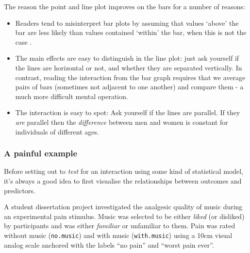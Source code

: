 \documentclass[]{article}
\begin{document}
The reason the point and line plot improves on the bars for a number of reasons:

\begin{itemize}
\item
  Readers tend to misinterpret bar plots by assuming that values `above' the
  bar are less likely than values contained `within' the bar, when this is not
  the case \citep{newman2012bar}.
\item
  The main effects are easy to distinguish in the line plot: just ask yourself
  if the lines are horizontal or not, and whether they are separated
  vertically. In contrast, reading the interaction from the bar graph requires
  that we average pairs of bars (sometimes not adjacent to one another) and
  compare them - a much more difficult mental operation.
\item
  The interaction is easy to spot: Ask yourself if the lines are parallel. If
  they \emph{are} parallel then the \emph{difference} between men and women is constant
  for individuals of different ages.
\end{itemize}

\hypertarget{pain-music-data}{%
\subsubsection*{A painful example}\label{pain-music-data}}

Before setting out to \emph{test} for an interaction using some kind of statistical
model, it's always a good idea to first visualise the relationships between
outcomes and predictors.

A student dissertation project investigated the analgesic quality of music
during an experimental pain stimulus. Music was selected to be either \emph{liked}
(or disliked) by participants and was either \emph{familiar} or unfamiliar to them.
Pain was rated without music (\texttt{no.music}) and with music (\texttt{with.music}) using a
10cm visual analog scale anchored with the labels ``no pain'' and ``worst pain
ever''.
\end{document}

